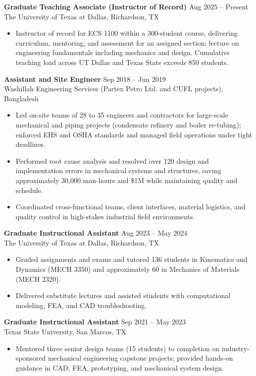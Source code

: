 \documentclass[11pt, letterpaper]{article}
\newcommand{\role}[2]{\textbf{#1} \hfill #2 \\}
\begin{document}
\role{Graduate Teaching Associate (Instructor of Record)}{Aug 2025 -- Present}
The University of Texas at Dallas, Richardson, TX
\begin{itemize}
    \item Instructor of record for ECS 1100 within a 300-student course, delivering curriculum, mentoring, and assessment for an assigned section; lecture on engineering fundamentals including mechanics and design. Cumulative teaching load across UT Dallas and Texas State exceeds 850 students.
\end{itemize}

\role{Assistant and Site Engineer}{Sep 2018 -- Jun 2019}
Washillah Engineering Services (Partex Petro Ltd. and CUFL projects), Bangladesh
\begin{itemize}
    \item Led on-site teams of 28 to 35 engineers and contractors for large-scale mechanical and piping projects (condensate refinery and boiler re-tubing); enforced EHS and OSHA standards and managed field operations under tight deadlines.
    \item Performed root cause analysis and resolved over 120 design and implementation errors in mechanical systems and structures, saving approximately 30,000 man-hours and \$1M while maintaining quality and schedule.
    \item Coordinated cross-functional teams, client interfaces, material logistics, and quality control in high-stakes industrial field environments.
\end{itemize}

\role{Graduate Instructional Assistant}{Aug 2023 -- May 2024}
The University of Texas at Dallas, Richardson, TX
\begin{itemize}
    \item Graded assignments and exams and tutored 136 students in Kinematics and Dynamics (MECH 3350) and approximately 60 in Mechanics of Materials (MECH 2320).
    \item Delivered substitute lectures and assisted students with computational modeling, FEA, and CAD troubleshooting.
\end{itemize}

\role{Graduate Instructional Assistant}{Sep 2021 -- May 2023}
Texas State University, San Marcos, TX
\begin{itemize}
    \item Mentored three senior design teams (15 students) to completion on industry-sponsored mechanical engineering capstone projects; provided hands-on guidance in CAD, FEA, prototyping, and mechanical system design.
\end{itemize}
\end{document}
